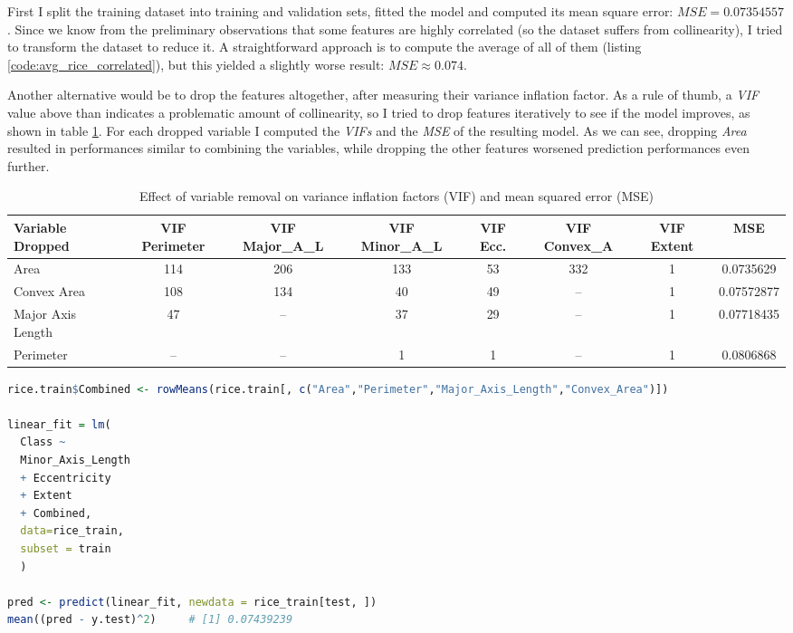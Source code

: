 First I split the training dataset into training and validation sets, fitted the model and computed its mean square error: $MSE = 0.07354557$. Since we know from the preliminary observations that some features are highly correlated (so the dataset suffers from collinearity), I tried to transform the dataset to reduce it. A straightforward approach is to compute the average of all of them (listing \ref{code:avg_rice_correlated}), but this yielded a slightly worse result: $MSE \approx 0.074$.

Another alternative would be to drop the features altogether, after measuring their variance inflation factor. As a rule of thumb, a \textit{VIF} value above than indicates a problematic amount of collinearity, so I tried to drop features iteratively to see if the model improves, as shown in table \ref{tab:vif_drop_analysis}. For each dropped variable I computed the \textit{VIFs} and the \textit{MSE} of the resulting model. As we can see, dropping \textit{Area} resulted in performances similar to combining the variables, while dropping the other features worsened prediction performances even further.

\begin{table}
  \small
  \centering
  \caption{Effect of variable removal on variance inflation factors (VIF) and mean squared error (MSE)}
  \label{tab:vif_drop_analysis}
  \begin{tabularx}{\textwidth}{lccccccc}
    \toprule
    Variable Dropped & VIF Perimeter & VIF Major\_A\_L & VIF Minor\_A\_L & VIF Ecc. & VIF Convex\_A & VIF Extent & MSE \\
    \midrule
    Area              & 114 & 206 & 133 & 53 & 332 & 1 & 0.0735629 \\
    Convex Area       & 108 & 134 & 40  & 49 & --  & 1 & 0.07572877 \\
    Major Axis Length & 47  & --  & 37  & 29 & --  & 1 & 0.07718435 \\
    Perimeter         & --  & --  & 1   & 1  & --  & 1 & 0.0806868 \\
    \bottomrule
  \end{tabularx}
\end{table}

\FloatBarrier
\begin{lstlisting}[language={R},label={code:avg_rice_correlated}, caption={Average of highly correlated features}]
rice.train$Combined <- rowMeans(rice.train[, c("Area","Perimeter","Major_Axis_Length","Convex_Area")])

linear_fit = lm(
  Class ~ 
  Minor_Axis_Length
  + Eccentricity
  + Extent
  + Combined, 
  data=rice_train, 
  subset = train
  )

pred <- predict(linear_fit, newdata = rice_train[test, ])
mean((pred - y.test)^2)     # [1] 0.07439239
\end{lstlisting}
\FloatBarrier

